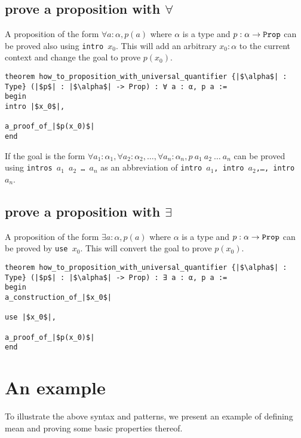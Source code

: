\documentclass{report}
\theoremstyle{definition}
\theoremstyle{plain}
\begin{document}
\subsection{prove a proposition with $\forall$}\label{lean:forall}
A proposition of the form $\forall a : \alpha, p(a)$ where $\alpha$ is a type and $p : \alpha\to {\tt Prop}$ can be proved also using {\tt intro $x_0$}. This will add an arbitrary $x_0:\alpha$ to the current context and change the goal to prove $p(x_0)$.

\begin{verbatim}
theorem how_to_proposition_with_universal_quantifier {|$\alpha$| : Type} (|$p$| : |$\alpha$| -> Prop) : ∀ a : α, p a :=
begin
intro |$x_0$|,

a_proof_of_|$p(x_0)$|
end
\end{verbatim}

If the goal is the form $\forall a_1:\alpha_1,\forall a_2:\alpha_2,\dots,\forall a_n:\alpha_n, p\ a_1\ a_2\ \dots\ a_n$ can be proved using {\tt intros $a_1$ $a_2$ \dots\  $a_n$} as an abbreviation of {\tt intro $a_1$, intro $a_2$,\dots, intro $a_n$}.

\subsection{prove a proposition with $\exists$}\label{lean:exists}
A proposition of the form $\exists a:\alpha, p(a)$ where $\alpha$ is a type and $p : \alpha\to {\tt Prop}$ can be proved by {\tt use $x_0$}. This will convert the goal to prove $p(x_0)$.

\begin{verbatim}
theorem how_to_proposition_with_universal_quantifier {|$\alpha$| : Type} (|$p$| : |$\alpha$| -> Prop) : ∃ a : α, p a :=
begin
a_construction_of_|$x_0$|

use |$x_0$|,
  
a_proof_of_|$p(x_0)$|
end
\end{verbatim}


\section{An example}
To illustrate the above syntax and patterns, we present an example of defining mean and proving some basic properties thereof.
\end{document}
